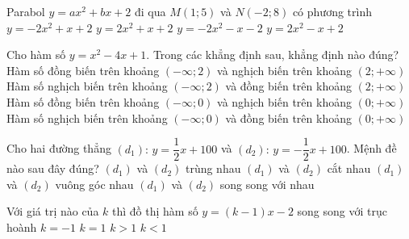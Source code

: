 \begin{ex}%
Parabol $y=ax^2 +bx +2$ đi qua $M(1;5)$ và $N(-2;8)$ có phương trình
	\choice
	{$y=-2x^2+x+2$}
	{\True $y=2x^2+x+2$}
	{$y=-2x^2-x-2$}
	{$y=2x^2-x+2$}
\end{ex}

\begin{ex}%
Cho hàm số $y=x^2-4x+1$. Trong các khẳng định sau, khẳng định nào đúng?
	\choice
	{Hàm số đồng biến trên khoảng $(-\infty ; 2)$ và nghịch biến trên khoảng $(2;+\infty )$}
	{\True Hàm số nghịch biến trên khoảng $(-\infty ; 2)$ và đồng biến trên khoảng $(2;+\infty )$}
	{Hàm số đồng biến trên khoảng $(-\infty ; 0)$ và nghịch biến trên khoảng $(0;+\infty )$}
	{Hàm số nghịch biến trên khoảng $(-\infty ; 0)$ và đồng biến trên khoảng $(0;+\infty )$}
\end{ex}

\begin{ex}%
Cho hai đường thẳng $(d_1)\colon \, y=\dfrac{1}{2}x+100$ và $(d_2)\colon \, y=-\dfrac{1}{2}x +100$. Mệnh đề nào sau đây đúng?
	\choice
	{$(d_1)$ và $(d_2)$ trùng nhau}
	{\True $(d_1)$ và $(d_2)$ cắt nhau}
	{$(d_1)$ và $(d_2)$ vuông góc nhau}
	{$(d_1)$ và $(d_2)$ song song với nhau}
\end{ex}

\begin{ex}%
Với giá trị nào của $k$ thì đồ thị hàm số $y=(k-1)x-2$ song song với trục hoành	
	\choice
	{$k=-1$}
	{\True $k=1$}
	{$k>1$}
	{$k<1$}
\end{ex}

